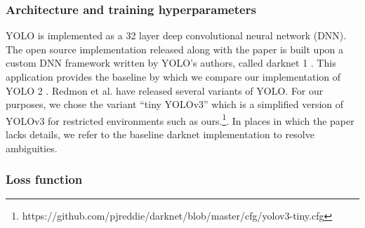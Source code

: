 \documentclass[a4paper]{article}
\begin{document}
\subsubsection*{Architecture and training hyperparameters}
YOLO is implemented as a 32 layer deep convolutional
neural network (DNN). The open source implementation released
along with the paper is built upon a custom DNN
framework written by YOLO’s authors, called darknet 1
.
This application provides the baseline by which we compare
our implementation of YOLO 2
. Redmon et al. have
released several variants of YOLO. For our purposes, we
chose the variant ``tiny YOLOv3'' which is a simplified version of YOLOv3 for restricted environments such as ours.\footnote{https://github.com/pjreddie/darknet/blob/master/cfg/yolov3-tiny.cfg}. In places in which the paper lacks details, we refer to the baseline darknet implementation
to resolve ambiguities.
\subsubsection*{Loss function}
\end{document}
